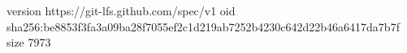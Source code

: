 version https://git-lfs.github.com/spec/v1
oid sha256:be8853f3fa3a09ba28f7055ef2c1d219ab7252b4230c642d22b46a6417da7b7f
size 7973
